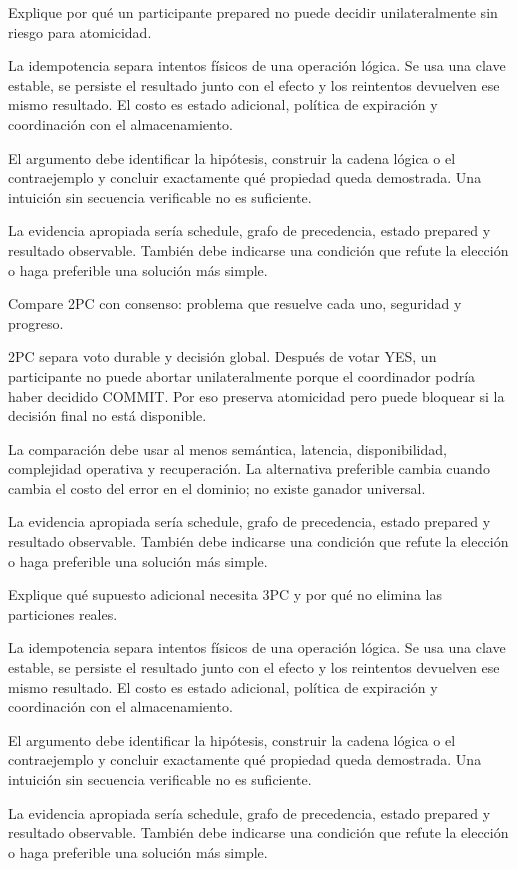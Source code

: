 \documentclass[variant=guia,cover=institutional,mode=screen]{ua-engineering-v6-article}
\begin{document}
\begin{uaexercise}
Explique por qué un participante prepared no puede decidir unilateralmente sin riesgo para atomicidad.
\end{uaexercise}
\begin{uaanswer}
La idempotencia separa intentos físicos de una operación lógica. Se usa una clave estable, se persiste el resultado junto con el efecto y los reintentos devuelven ese mismo resultado. El costo es estado adicional, política de expiración y coordinación con el almacenamiento.

El argumento debe identificar la hipótesis, construir la cadena lógica o el contraejemplo y concluir exactamente qué propiedad queda demostrada. Una intuición sin secuencia verificable no es suficiente.

La evidencia apropiada sería schedule, grafo de precedencia, estado prepared y resultado observable. También debe indicarse una condición que refute la elección o haga preferible una solución más simple.
\end{uaanswer}

\begin{uaexercise}
Compare 2PC con consenso: problema que resuelve cada uno, seguridad y progreso.
\end{uaexercise}
\begin{uaanswer}
2PC separa voto durable y decisión global. Después de votar YES, un participante no puede abortar unilateralmente porque el coordinador podría haber decidido COMMIT. Por eso preserva atomicidad pero puede bloquear si la decisión final no está disponible.

La comparación debe usar al menos semántica, latencia, disponibilidad, complejidad operativa y recuperación. La alternativa preferible cambia cuando cambia el costo del error en el dominio; no existe ganador universal.

La evidencia apropiada sería schedule, grafo de precedencia, estado prepared y resultado observable. También debe indicarse una condición que refute la elección o haga preferible una solución más simple.
\end{uaanswer}

\begin{uaexercise}
Explique qué supuesto adicional necesita 3PC y por qué no elimina las particiones reales.
\end{uaexercise}
\begin{uaanswer}
La idempotencia separa intentos físicos de una operación lógica. Se usa una clave estable, se persiste el resultado junto con el efecto y los reintentos devuelven ese mismo resultado. El costo es estado adicional, política de expiración y coordinación con el almacenamiento.

El argumento debe identificar la hipótesis, construir la cadena lógica o el contraejemplo y concluir exactamente qué propiedad queda demostrada. Una intuición sin secuencia verificable no es suficiente.

La evidencia apropiada sería schedule, grafo de precedencia, estado prepared y resultado observable. También debe indicarse una condición que refute la elección o haga preferible una solución más simple.
\end{uaanswer}
\end{document}
